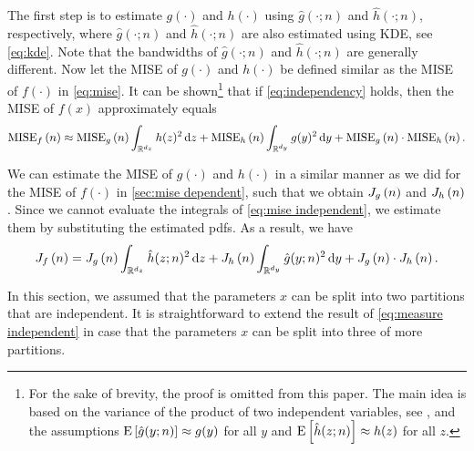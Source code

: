 The first step is to estimate $g(\cdot)$ and $h(\cdot)$ using $\hat{g}(\cdot;n)$ and $\hat{h}(\cdot;n)$, respectively, where $\hat{g}(\cdot;n)$ and $\hat{h}(\cdot;n)$ are 
\cstart
also estimated using KDE, see 
\cend
\cref{eq:kde}. Note that the bandwidths of $\hat{g}(\cdot;n)$ and $\hat{h}(\cdot;n)$ are generally different. Now let the MISE of $g(\cdot)$ and $h(\cdot)$ be defined similar as the MISE of $f(\cdot)$ in \cref{eq:mise}. It can be shown\footnote{For the sake of brevity, the proof is omitted from this paper. The main idea is based on the variance of the product of two independent variables, see \textcite{goodman1960exact}, and the assumptions $\textup{E} \left[ \hat{g}(y;n) \right] \approx g(y)$ for all $y$ and $\textup{E} \left[ \hat{h}(z;n) \right] \approx h(z)$ for all $z$.} that if \cref{eq:independency} holds, then the MISE of $f(x)$ approximately equals
\begin{dmath}
	\label{eq:mise independent}
	\mise{f}{n} \approx \mise{g}{n} \int_{\mathbb{R}^{d_z}} h(z)^2 \ud z + \mise{h}{n} \int_{\mathbb{R}^{d_y}} g(y)^2 \ud y + \mise{g}{n} \cdot \mise{h}{n}.
\end{dmath}

We can estimate the MISE of $g(\cdot)$ and $h(\cdot)$ in a similar manner as we did for the MISE of $f(\cdot)$ in \cref{sec:mise dependent}, such that we obtain $J_{g} \left( n \right)$ and $J_{h} \left( n \right)$. Since we cannot evaluate the integrals of \cref{eq:mise independent}, we estimate them by substituting the estimated pdfs. As a result, we have
\begin{dmath}
	\label{eq:measure independent}
	\measure{f}{n} = \measure{g}{n} \int_{\mathbb{R}^{d_z}} \hat{h}(z;n)^2 \ud z + \measure{h}{n} \int_{\mathbb{R}^{d_y}} \hat{g}(y;n)^2 \ud y + \measure{g}{n} \cdot \measure{h}{n}.
\end{dmath}

In this section, we assumed that the parameters $x$ can be split into two partitions that are independent. It is straightforward to extend the result of \cref{eq:measure independent} in case that the parameters $x$ can be split into three of more partitions. 
